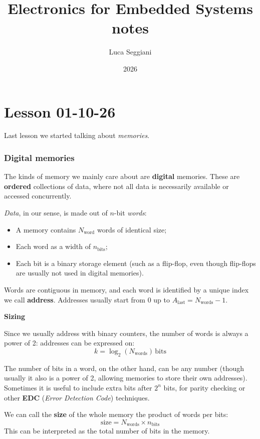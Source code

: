 \documentclass[a4paper,11pt]{article}
\title{Electronics for Embedded Systems notes}
\author{Luca Seggiani}
\date{2026}
\begin{document}
\section{Lesson 01-10-26}

\thispagestyle{empty}
\pagestyle{fancy}

Last lesson we started talking about \textit{memories}.

\subsubsection{Digital memories}

The kinds of memory we mainly care about are \textbf{digital} memories.
These are \textbf{ordered} collections of data, where not all data is necessarily available or accessed concurrently.

\textit{Data}, in our sense, is made out of $n$-bit \textit{words}:
\begin{itemize}
	\item A memory contains $N_\text{word}$ words of identical size;
	\item Each word as a width of $n_\text{bits}$;
	\item Each bit is a binary storage element (such as a flip-flop, even though flip-flops are usually not used in digital memories).
\end{itemize}

Words are contiguous in memory, and each word is identified by a unique index we call \textbf{address}.
Addresses usually start from $0$ up to $A_\text{last} = N_\text{words} - 1$.

\par\smallskip
\textbf{\textsf{Sizing}}

Since we usually address with binary counters, the number of words is always a power of 2:
addresses can be expressed on:
$$
	k = \log_2(N_\text{words}) \, \text{bits}
$$

The number of bits in a word, on the other hand, can be any number (though usually it also is a power of 2, allowing memories to store their own addresses).
Sometimes it is useful to include extra bits after $2^n$ bits, for parity checking or other \textbf{EDC} (\textit{Error Detection Code}) techniques.

We can call the \textbf{size} of the whole memory the product of words per bits:
$$
	\text{size} = N_\text{words} \times n_\text{bits}
$$
This can be interpreted as the total number of bits in the memory.
\end{document}
